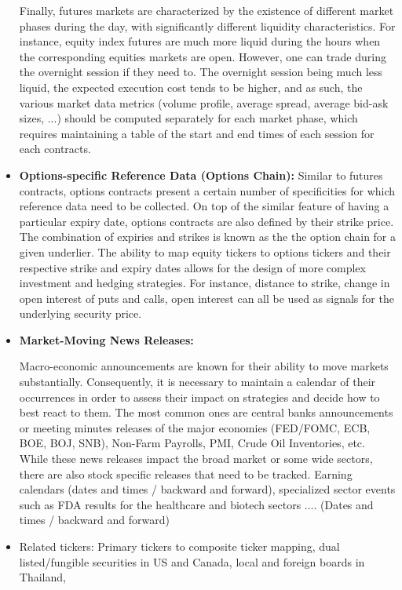 \begin{itemize}
Finally, futures markets are characterized by the existence of different market phases during the day, with significantly different liquidity characteristics. For instance, equity index futures are much more liquid during the hours when the corresponding equities markets are open. However, one can trade during the overnight session if they need to. The overnight session being much less liquid, the expected execution cost tends to be higher, and as such, the various market data metrics (volume profile, average spread, average bid-ask sizes, ...) should be computed separately for each market phase, which requires maintaining a table of the start and end times of each session for each contracts. 


\item \textbf{Options-specific Reference Data (Options Chain):} Similar to futures contracts, options contracts present a certain number of specificities for which reference data need to be collected. On top of the similar feature of having a particular expiry date, options contracts are also defined by their strike price. The combination of expiries and strikes is known as the the option chain for a given underlier. The ability to map equity tickers to options tickers and their respective strike and expiry dates allows for the design of more complex investment and hedging strategies. For instance, distance to strike, change in open interest of puts and calls, open interest can all be used as signals for the underlying security price.


\item \textbf{Market-Moving News Releases:} 

Macro-economic announcements are known for their ability to move markets substantially. Consequently, it is necessary to maintain a calendar of their occurrences in order to assess their impact on strategies and decide how to best react to them. The most common ones are central banks announcements or meeting minutes releases of the major economies (FED/FOMC, ECB, BOE, BOJ, SNB), Non-Farm Payrolls, PMI, Crude Oil Inventories, etc. While these news releases impact the broad market or some wide sectors, there are also stock specific releases that need to be tracked. Earning calendars (dates and times / backward and forward), specialized sector events such as FDA results for the healthcare and biotech sectors  .... (Dates and times / backward and forward)


\item Related tickers: Primary tickers to composite ticker mapping, dual listed/fungible securities in US and Canada, local and foreign boards in Thailand, 



\end{itemize}
